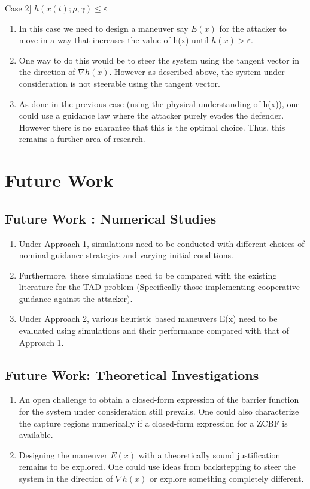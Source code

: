 \documentclass[11pt]{article}
\theoremstyle{definition}
\theoremstyle{remark}
\begin{document}
Case 2] $h(x(t);\rho , \gamma) \leq \varepsilon$\\
\begin{enumerate}
    \item In this case we need to design a maneuver say $E(x)$ for the attacker to move in a way that increases the value of h(x) until $h(x) > \varepsilon$.\\
    \item One way to do this would be to steer the system using the tangent vector in the direction of $\nabla h(x)$. However as described above, the system under consideration is not steerable using the tangent vector.\\
    \item As done in the previous case (using the physical understanding of h(x)), one could use a guidance law where the attacker purely evades the defender. However there is no guarantee that this is the optimal choice. Thus, this remains a further area of research.
\end{enumerate}

\section{Future Work} \label{sec:7}
\subsection{Future Work : Numerical Studies}
\begin{enumerate}
    \item Under Approach 1, simulations need to be conducted with different choices of nominal guidance strategies and varying initial conditions.\\
    \item Furthermore, these simulations need to be compared with the existing literature for the TAD problem (Specifically those implementing cooperative guidance against the attacker).
    \item Under Approach 2, various heuristic based maneuvers E(x) need to be evaluated using simulations and their performance compared with that of Approach 1.\\
\end{enumerate}
\subsection{Future Work: Theoretical Investigations}
\begin{enumerate}
    \item An open challenge to obtain a closed-form expression of the barrier function for the system under consideration still prevails. One could also characterize the capture regions numerically if a closed-form expression for a ZCBF is available.\\
    \item Designing the maneuver $E(x)$ with a theoretically sound justification remains to be explored. One could use ideas from backstepping to steer the system in the direction of $\nabla h(x)$ or explore something completely different.
\end{enumerate}
  
\end{document}
